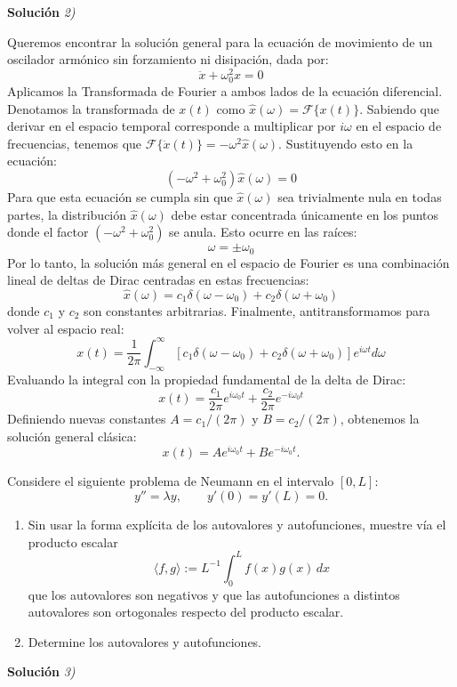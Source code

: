 \documentclass[11pt,spanish]{article}
\newcounter{problema}
\newcommand{\prob}{\stepcounter{problema} \vspace{.5cm} \noindent{\bf Problema \arabic{problema}: }}
\begin{document}
\vspace{0.5cm}
{\bf Soluci\'on }{\em 2)}
\vspace{0.5cm}

Queremos encontrar la solución general para la ecuación de movimiento de un oscilador armónico sin forzamiento ni disipación, dada por:
$$\ddot{x}+\omega_{0}^{2}x=0$$
Aplicamos la Transformada de Fourier a ambos lados de la ecuación diferencial. Denotamos la transformada de $x(t)$ como $\hat{x}(\omega) = \mathcal{F}\{x(t)\}$.
Sabiendo que derivar en el espacio temporal corresponde a multiplicar por $i\omega$ en el espacio de frecuencias, tenemos que $\mathcal{F}\{\ddot{x}(t)\} = -\omega^2 \hat{x}(\omega)$.
Sustituyendo esto en la ecuación:
$$(-\omega^2 + \omega_0^2)\hat{x}(\omega) = 0$$
Para que esta ecuación se cumpla sin que $\hat{x}(\omega)$ sea trivialmente nula en todas partes, la distribución $\hat{x}(\omega)$ debe estar concentrada únicamente en los puntos donde el factor $(-\omega^2 + \omega_0^2)$ se anula. Esto ocurre en las raíces:
$$\omega = \pm \omega_0$$
Por lo tanto, la solución más general en el espacio de Fourier es una combinación lineal de deltas de Dirac centradas en estas frecuencias:
$$\hat{x}(\omega) = c_1 \delta(\omega - \omega_0) + c_2 \delta(\omega + \omega_0)$$
donde $c_1$ y $c_2$ son constantes arbitrarias.
Finalmente, antitransformamos para volver al espacio real:
$$x(t) = \frac{1}{2\pi} \int_{-\infty}^{\infty} \left[ c_1 \delta(\omega - \omega_0) + c_2 \delta(\omega + \omega_0) \right] e^{i\omega t} d\omega$$
Evaluando la integral con la propiedad fundamental de la delta de Dirac:
$$x(t) = \frac{c_1}{2\pi} e^{i\omega_0 t} + \frac{c_2}{2\pi} e^{-i\omega_0 t}$$
Definiendo nuevas constantes $A = c_1 / (2\pi)$ y $B = c_2 / (2\pi)$, obtenemos la solución general clásica:
$$x(t) = A e^{i\omega_0 t} + B e^{-i\omega_0 t}.$$

\prob Considere el siguiente problema de Neumann en el intervalo $[0, L]$:
\[
y'' = \lambda y,\qquad y'(0)=y'(L)=0.
\]
\begin{enumerate}
\item Sin usar la forma explícita de los autovalores y autofunciones, muestre vía el producto escalar
\[
\langle f, g\rangle := L^{-1}\int_0^L f(x)g(x)\,dx
\]
que los autovalores son negativos y que las autofunciones a distintos autovalores son ortogonales respecto del producto escalar.
\item Determine los autovalores y autofunciones.
\end{enumerate}

\vspace{0.5cm}
{\bf Soluci\'on }{\em 3)}
\vspace{0.5cm}
\end{document}
